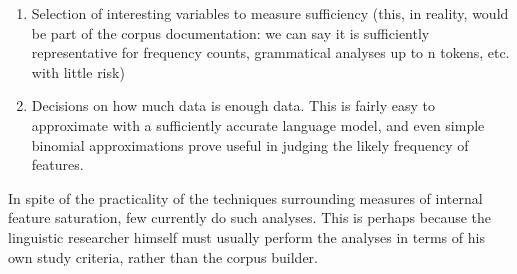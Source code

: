 \begin{enumerate}
 \item Selection of interesting variables to measure sufficiency (this, in reality, would be part of the corpus documentation: we can say it is sufficiently representative for frequency counts, grammatical analyses up to n tokens, etc. with little risk)
 \item Decisions on how much data is enough data.  This is fairly easy to approximate with a sufficiently accurate language model, and even simple binomial approximations prove useful in judging the likely frequency of features.
\end{enumerate}

In spite of the practicality of the techniques surrounding measures of internal feature saturation, few currently do such analyses.  This is perhaps because the linguistic researcher himself must usually perform the analyses in terms of his own study criteria, rather than the corpus builder.








